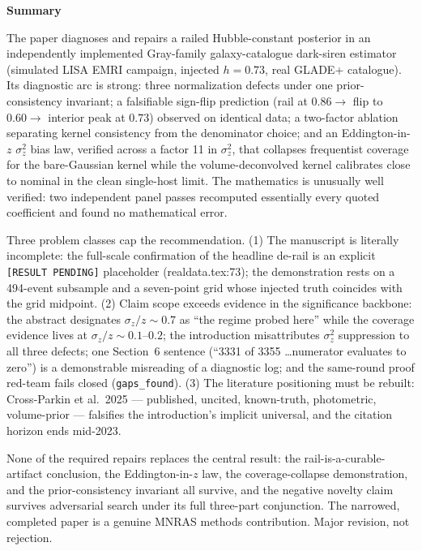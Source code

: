 \documentclass[11pt]{article}
\begin{document}
\begin{SummaryBox}
\textbf{Summary}

The paper diagnoses and repairs a railed Hubble-constant posterior in an independently implemented Gray-family galaxy-catalogue dark-siren estimator (simulated LISA EMRI campaign, injected $h = 0.73$, real GLADE+ catalogue). Its diagnostic arc is strong: three normalization defects under one prior-consistency invariant; a falsifiable sign-flip prediction (rail at $0.86 \to$ flip to $0.60 \to$ interior peak at $0.73$) observed on identical data; a two-factor ablation separating kernel consistency from the denominator choice; and an Eddington-in-$z$ $\sigma_z^2$ bias law, verified across a factor 11 in $\sigma_z^2$, that collapses frequentist coverage for the bare-Gaussian kernel while the volume-deconvolved kernel calibrates close to nominal in the clean single-host limit. The mathematics is unusually well verified: two independent panel passes recomputed essentially every quoted coefficient and found no mathematical error.

Three problem classes cap the recommendation. (1) The manuscript is literally incomplete: the full-scale confirmation of the headline de-rail is an explicit \texttt{[RESULT PENDING]} placeholder (realdata.tex:73); the demonstration rests on a 494-event subsample and a seven-point grid whose injected truth coincides with the grid midpoint. (2) Claim scope exceeds evidence in the significance backbone: the abstract designates $\sigma_z/z \sim 0.7$ as ``the regime probed here'' while the coverage evidence lives at $\sigma_z/z \sim 0.1$--$0.2$; the introduction misattributes $\sigma_z^2$ suppression to all three defects; one Section~6 sentence (``3331 of 3355 \ldots numerator evaluates to zero'') is a demonstrable misreading of a diagnostic log; and the same-round proof red-team fails closed (\texttt{gaps\_found}). (3) The literature positioning must be rebuilt: Cross-Parkin et al.\ 2025 --- published, uncited, known-truth, photometric, volume-prior --- falsifies the introduction's implicit universal, and the citation horizon ends mid-2023.

None of the required repairs replaces the central result: the rail-is-a-curable-artifact conclusion, the Eddington-in-$z$ law, the coverage-collapse demonstration, and the prior-consistency invariant all survive, and the negative novelty claim survives adversarial search under its full three-part conjunction. The narrowed, completed paper is a genuine MNRAS methods contribution. Major revision, not rejection.
\end{SummaryBox}
\end{document}

